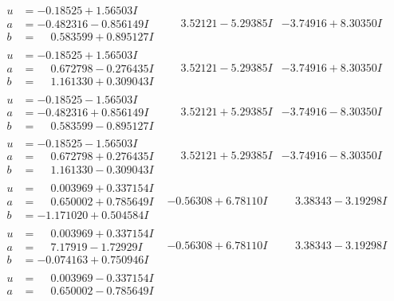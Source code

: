\documentclass[1p]{elsarticle_modified}
\theoremstyle{definition}
\begin{document}
$$\begin{array}{c|c|c}
 \hline 
\begin{aligned}
u &= -0.18525 + 1.56503 I \\
a &= -0.482316 - 0.856149 I \\
b &= \phantom{-}0.583599 + 0.895127 I\end{aligned}
 & \phantom{-}3.52121 - 5.29385 I & -3.74916 + 8.30350 I \\ \hline\begin{aligned}
u &= -0.18525 + 1.56503 I \\
a &= \phantom{-}0.672798 - 0.276435 I \\
b &= \phantom{-}1.161330 + 0.309043 I\end{aligned}
 & \phantom{-}3.52121 - 5.29385 I & -3.74916 + 8.30350 I \\ \hline\begin{aligned}
u &= -0.18525 - 1.56503 I \\
a &= -0.482316 + 0.856149 I \\
b &= \phantom{-}0.583599 - 0.895127 I\end{aligned}
 & \phantom{-}3.52121 + 5.29385 I & -3.74916 - 8.30350 I \\ \hline\begin{aligned}
u &= -0.18525 - 1.56503 I \\
a &= \phantom{-}0.672798 + 0.276435 I \\
b &= \phantom{-}1.161330 - 0.309043 I\end{aligned}
 & \phantom{-}3.52121 + 5.29385 I & -3.74916 - 8.30350 I \\ \hline\begin{aligned}
u &= \phantom{-}0.003969 + 0.337154 I \\
a &= \phantom{-}0.650002 + 0.785649 I \\
b &= -1.171020 + 0.504584 I\end{aligned}
 & -0.56308 + 6.78110 I & \phantom{-}3.38343 - 3.19298 I \\ \hline\begin{aligned}
u &= \phantom{-}0.003969 + 0.337154 I \\
a &= \phantom{-}7.17919 - 1.72929 I \\
b &= -0.074163 + 0.750946 I\end{aligned}
 & -0.56308 + 6.78110 I & \phantom{-}3.38343 - 3.19298 I \\ \hline\begin{aligned}
u &= \phantom{-}0.003969 - 0.337154 I \\
a &= \phantom{-}0.650002 - 0.785649 I \\

\end{aligned}
\end{array}$$
\end{document}
